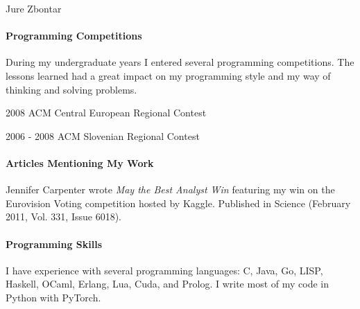 \documentclass[12pt,a4paper]{article}
\begin{document}
\begin{cv}{Jure Zbontar}
\paragraph*{Programming Competitions}
During my undergraduate years I entered several programming competitions. The
lessons learned had a great impact on my programming style and my way of
thinking and solving problems.

\begin{cvlist}{}
\item[2008] ACM Central European Regional Contest
\item[2006 - 2008] ACM Slovenian Regional Contest
\end{cvlist}

\paragraph*{Articles Mentioning My Work}
Jennifer Carpenter wrote \textit{May the Best Analyst Win} featuring my win on the
Eurovision Voting competition hosted by Kaggle. Published in Science (February
2011, Vol.  331, Issue 6018).

\paragraph*{Programming Skills}
I have experience with several programming languages: C, Java, Go, LISP,
Haskell, OCaml, Erlang, Lua, Cuda, and Prolog. I write most of my code in Python with
PyTorch.

\newpage
\nocite{zbontar2018fastmri,tygert2018simulating,tygert2018compressed,provodin2016fast,zbontar2016stereo,zbontar2015computing,demvsar2013orange,zbontar2012team}
{}


\end{cv}
\end{document}
